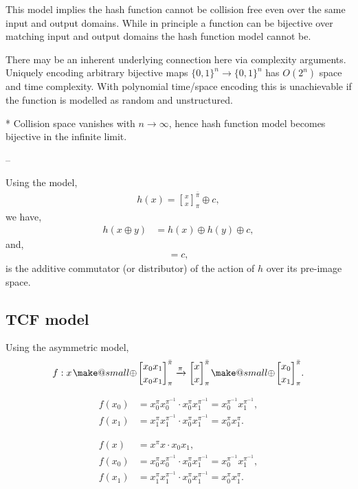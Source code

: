 \documentclass[twocolumn, aps, amsmath, amssymb, nofootinbib, superscriptaddress, longbibliography, doublefloatfix, table-of-contents, eqsecnum, rmp]{revtex4-2}
\makeatletter
\newcommand{\stackbraid}[2]{{\genfrac{[}{]}{0pt}{}{{#1}}{{#2}}}^{\bar{\pi}}_{\pi}}
\newcommand{\soplus}{{{\hspace{1pt}}{\mathbin{\mathpalette\make@small{\mathbin\oplus}}}}{\hspace{1pt}}}
\newcommand{\make@small}[2]{%
  \vcenter{\hbox{%
    \scalebox{0.6}{$\m@th#1#2$}%
  }}%
}
\makeatother
\begin{document}
This model implies the hash function cannot be collision free even over the same input and output domains. While in principle a function can be bijective over matching input and output domains the hash function model cannot be.

There may be an inherent underlying connection here via complexity arguments. Uniquely encoding arbitrary bijective maps \mbox{$\{0,1\}^n\to \{0,1\}^n$} has $O(2^n)$ space and time complexity. With polynomial time/space encoding this is unachievable if the function is modelled as random and unstructured.

* Collision space vanishes with $n\to\infty$, hence hash function model becomes bijective in the infinite limit. 

--

Using the model,
\begin{align}
	h(x) = \stackbraid{x}{x} \oplus c,	
\end{align}
we have,
\begin{align}
	h(x\oplus y) &= h(x)\oplus h(y) \oplus c,
\end{align}
and,
\begin{align}
	[h(x\oplus y), h(x)\oplus h(y)] = c,
\end{align}
is the additive commutator (or distributor) of the action of $h$ over its pre-image space.

\subsection{TCF model}

Using the asymmetric model,
\begin{align}
	f: x\soplus \stackbraid{x_0 x_1}{x_0 x_1} \xrightarrow{\pi} \stackbraid{x}{x} \soplus \stackbraid{x_0}{x_1}.
\end{align}

\begin{align}
	f(x_0) &= x_0^\pi x_0^{\pi^{-1}} \cdot x_0^\pi x_1^{\pi^{-1}} = x_0^{\pi^{-1}} x_1^{\pi^{-1}},\nonumber\\
	f(x_1) &= x_1^\pi x_1^{\pi^{-1}} \cdot x_0^\pi x_1^{\pi^{-1}} = x_0^{\pi} x_1^{\pi}.
\end{align}

\begin{align}
	f(x) &= x^\pi x \cdot x_0 x_1,\nonumber\\
	f(x_0) &= x_0^\pi x_0^{\pi^{-1}} \cdot x_0^\pi x_1^{\pi^{-1}} = x_0^{\pi^{-1}} x_1^{\pi^{-1}},\nonumber\\
	f(x_1) &= x_1^\pi x_1^{\pi^{-1}} \cdot x_0^\pi x_1^{\pi^{-1}} = x_0^{\pi} x_1^{\pi}.
\end{align}
\end{document}
